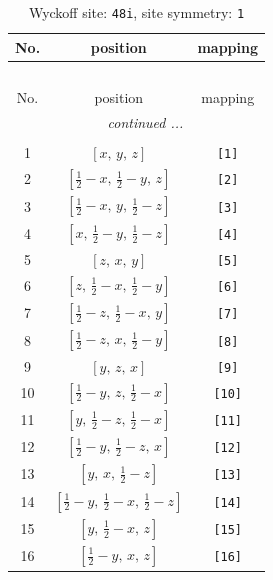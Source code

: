 \documentclass[fleqn,8pt]{jsarticle}
\begin{document}
\begin{longtable}{ccc}
\caption{Wyckoff site: {\tt 48i}, site symmetry: {\tt 1}}
 \\
 \hline \hline
No. & position & mapping \\ \hline \endfirsthead

\multicolumn{2}{l}{\tablename\ \thetable{}} \\
 \hline \hline
No. & position & mapping \\ \hline \endhead

 \hline \hline
\multicolumn{2}{r}{\footnotesize\it continued ...} \\ \endfoot

 \hline \hline
\multicolumn{2}{r}{} \\ \endlastfoot

1 & $\left[ x,\, y,\, z \right]$ & {\tt [1]} \\ \hline
2 & $\left[ \frac{1}{2} - x,\, \frac{1}{2} - y,\, z \right]$ & {\tt [2]} \\ \hline
3 & $\left[ \frac{1}{2} - x,\, y,\, \frac{1}{2} - z \right]$ & {\tt [3]} \\ \hline
4 & $\left[ x,\, \frac{1}{2} - y,\, \frac{1}{2} - z \right]$ & {\tt [4]} \\ \hline
5 & $\left[ z,\, x,\, y \right]$ & {\tt [5]} \\ \hline
6 & $\left[ z,\, \frac{1}{2} - x,\, \frac{1}{2} - y \right]$ & {\tt [6]} \\ \hline
7 & $\left[ \frac{1}{2} - z,\, \frac{1}{2} - x,\, y \right]$ & {\tt [7]} \\ \hline
8 & $\left[ \frac{1}{2} - z,\, x,\, \frac{1}{2} - y \right]$ & {\tt [8]} \\ \hline
9 & $\left[ y,\, z,\, x \right]$ & {\tt [9]} \\ \hline
10 & $\left[ \frac{1}{2} - y,\, z,\, \frac{1}{2} - x \right]$ & {\tt [10]} \\ \hline
11 & $\left[ y,\, \frac{1}{2} - z,\, \frac{1}{2} - x \right]$ & {\tt [11]} \\ \hline
12 & $\left[ \frac{1}{2} - y,\, \frac{1}{2} - z,\, x \right]$ & {\tt [12]} \\ \hline
13 & $\left[ y,\, x,\, \frac{1}{2} - z \right]$ & {\tt [13]} \\ \hline
14 & $\left[ \frac{1}{2} - y,\, \frac{1}{2} - x,\, \frac{1}{2} - z \right]$ & {\tt [14]} \\ \hline
15 & $\left[ y,\, \frac{1}{2} - x,\, z \right]$ & {\tt [15]} \\ \hline
16 & $\left[ \frac{1}{2} - y,\, x,\, z \right]$ & {\tt [16]} \\ \hline

\end{longtable}
\end{document}

